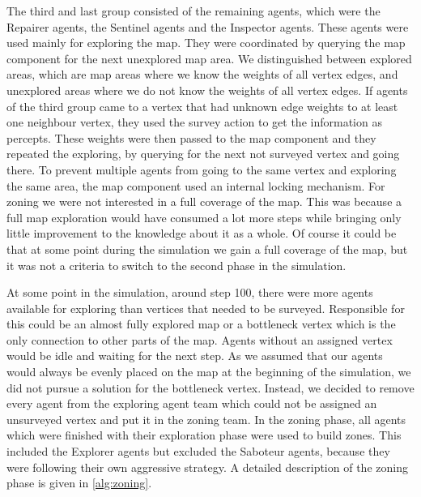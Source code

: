 The third and last group consisted of the remaining agents, which were the Repairer agents, the Sentinel agents and the Inspector agents.
These agents were used mainly for exploring the map.
They were coordinated by querying the map component for the next unexplored map area. We distinguished between explored areas, which are map areas where we know the weights of all vertex edges, and unexplored areas where we do not know the weights of all vertex edges.
If agents of the third group came to a vertex that had unknown edge weights to at least one neighbour vertex, they used the survey action to get the information as percepts.
These weights were then passed to the map component and they repeated the exploring, by querying for the next not surveyed vertex and going there.
To prevent multiple agents from going to the same vertex and exploring the same area, the map component used an internal locking mechanism.
For zoning we were not interested in a full coverage of the map.
This was because a full map exploration would have consumed a lot more steps while bringing only little improvement to the knowledge about it as a whole.
Of course it could be that at some point during the simulation we gain a full coverage of the map, but it was not a criteria to switch to the second phase in the simulation.

At some point in the simulation, around step 100, there were more agents available for exploring than vertices that needed to be surveyed. Responsible for this could be an almost fully explored map or a bottleneck vertex which is the only connection to other parts of the map.
Agents without an assigned vertex would be idle and waiting for the next step.
As we assumed that our agents would always be evenly placed on the map at the beginning of the simulation, we did not pursue a solution for the bottleneck vertex.
Instead, we decided to remove every agent from the exploring agent team which could not be assigned an unsurveyed vertex and put it in the zoning team.
In the zoning phase, all agents which were finished with their exploration phase were used to build zones.
This included the Explorer agents but excluded the Saboteur agents, because they were following their own aggressive strategy.
A detailed description of the zoning phase is given in \autoref{alg:zoning}.
